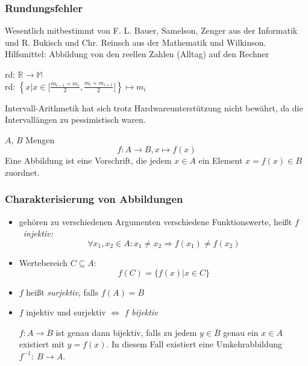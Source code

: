 \subsubsection*{Rundungsfehler}

Wesentlich mitbestimmt von F. L. Bauer, Samelson, Zenger aus der Informatik und R. Bukisch und Chr. Reinsch aus der Mathematik und Wilkinson.\\
Hilfsmittel: Abbildung von den reellen Zahlen (Alltag) auf den Rechner

\begin{definition}
rd: $\mathbb{R}\rightarrow\mathbb{M}$\\
rd: $\left\{x|x \in [\frac{m_{i-1}+m_i}{2},\frac{m_{i}+m_{i+1}}{2}[\right\} \mapsto m_i$
\end{definition}

\begin{note}
Intervall-Arithmetik hat sich trotz Hardwareunterstützung nicht bewährt, da die Intervallängen zu pessimistisch waren.
\end{note}

\begin{definition}[Abbildung] $A$, $B$ Mengen
\begin{equation*}f: A \rightarrow B, x \mapsto f(x)\end{equation*}
Eine Abbildung ist eine Vorschrift, die jedem $x \in A$ ein Element $x=f(x) \in B$ zuordnet.
\end{definition}

\subsubsection*{Charakterisierung von Abbildungen}
\begin{itemize}
 \item gehören zu verschiedenen Argumenten verschiedene Funktionswerte, heißt $f$~\emph{injektiv:}
\[\forall x_1,x_2 \in A: x_1 \neq x_2 \Rightarrow f(x_1) \neq f(x_2)\]
 \item Wertebereich $C \subseteq A$:
\[ f(C) = \{f(x)|x\in C\} \]
 \item $f$ heißt \emph{surjektiv}, falls $f(A)=B$
 \item $f$ injektiv und surjektiv $\Leftrightarrow$ $f$ \emph{bijektiv}

$f: A \to B$ ist genau dann bijektiv, falls zu jedem $y \in B$ genau ein $x \in A $ existiert mit $y=f(x)$. In diesem Fall existiert eine Umkehrabbildung $f^{-1}:~B \to A$.
\end{itemize}

\endgroup
